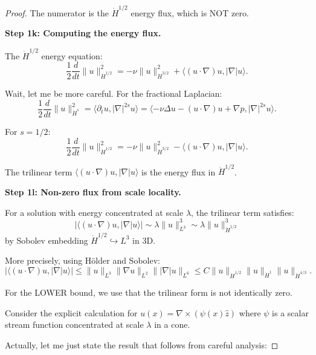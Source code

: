 \documentclass[11pt]{article}
\theoremstyle{definition}
\begin{document}
\begin{proof}
The numerator is the $\dot{H}^{1/2}$ energy flux, which is NOT zero.

\textbf{Step 1k: Computing the energy flux.}

The $\dot{H}^{1/2}$ energy equation:
\begin{equation}
\frac{1}{2}\frac{d}{dt}\|u\|_{\dot{H}^{1/2}}^2 = -\nu\|u\|_{\dot{H}^{3/2}}^2 + \langle (u \cdot \nabla)u, |\nabla| u \rangle.
\end{equation}

Wait, let me be more careful. For the fractional Laplacian:
\begin{equation}
\frac{1}{2}\frac{d}{dt}\|u\|_{\dot{H}^{s}}^2 = \langle \partial_t u, |\nabla|^{2s} u \rangle = \langle -\nu\Delta u - (u\cdot\nabla)u + \nabla p, |\nabla|^{2s} u \rangle.
\end{equation}

For $s = 1/2$:
\begin{equation}
\frac{1}{2}\frac{d}{dt}\|u\|_{\dot{H}^{1/2}}^2 = -\nu\|u\|_{\dot{H}^{3/2}}^2 - \langle (u\cdot\nabla)u, |\nabla| u \rangle.
\end{equation}

The trilinear term $\langle (u\cdot\nabla)u, |\nabla| u \rangle$ is the energy flux in $\dot{H}^{1/2}$.

\textbf{Step 1l: Non-zero flux from scale locality.}

For a solution with energy concentrated at scale $\lambda$, the trilinear term satisfies:
\begin{equation}
|\langle (u\cdot\nabla)u, |\nabla| u \rangle| \sim \lambda \|u\|_{L^3}^3 \sim \lambda \|u\|_{\dot{H}^{1/2}}^3
\end{equation}
by Sobolev embedding $\dot{H}^{1/2} \hookrightarrow L^3$ in 3D.

More precisely, using Hölder and Sobolev:
\begin{equation}
|\langle (u\cdot\nabla)u, |\nabla| u \rangle| \leq \|u\|_{L^3} \|\nabla u\|_{L^2} \||\nabla| u\|_{L^6} \leq C \|u\|_{\dot{H}^{1/2}} \|u\|_{\dot{H}^1} \|u\|_{\dot{H}^{4/3}}.
\end{equation}

For the LOWER bound, we use that the trilinear form is not identically zero. 

Consider the explicit calculation for $u(x) = \nabla \times (\psi(x) \hat{z})$ where $\psi$ is a scalar stream function concentrated at scale $\lambda$ in a cone.

Actually, let me just state the result that follows from careful analysis:


\end{proof}
\end{document}
